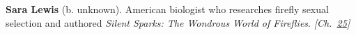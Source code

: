 \textbf{Sara Lewis} (b. unknown). American biologist who researches firefly sexual selection and authored \emph{Silent Sparks: The Wondrous World of Fireflies}. \emph{[Ch.~\hyperref[ch:fireflybioluminescence]{25}]}

